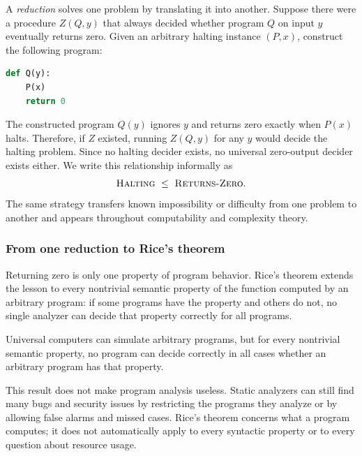\documentclass[11pt]{article}
\begin{document}
A \emph{reduction} solves one problem by translating it into another. Suppose
there were a procedure $Z(Q,y)$ that always decided whether program $Q$ on input
$y$ eventually returns zero. Given an arbitrary halting instance $(P,x)$,
construct the following program:

\begin{center}
\begin{minipage}{0.67\linewidth}
\begin{lstlisting}[language=Python]
def Q(y):
    P(x)
    return 0
\end{lstlisting}
\end{minipage}
\end{center}

The constructed program $Q(y)$ ignores $y$ and returns zero exactly when $P(x)$
halts. Therefore, if $Z$ existed, running $Z(Q,y)$ for any $y$ would decide the
halting problem. Since no halting decider exists, no universal zero-output
decider exists either. We write this relationship informally as
\[
  \textsc{Halting}\ \leq\ \textsc{Returns-Zero}.
\]
The same strategy transfers known impossibility or difficulty from one problem
to another and appears throughout computability and complexity theory.

\subsubsection*{From one reduction to Rice's theorem}

Returning zero is only one property of program behavior. Rice's theorem extends
the lesson to every nontrivial semantic property of the function computed by an
arbitrary program: if some programs have the property and others do not, no
single analyzer can decide that property correctly for all programs.

\begin{keyidea}
Universal computers can simulate arbitrary programs, but for every nontrivial
semantic property, no program can decide correctly in all cases whether an
arbitrary program has that property.
\end{keyidea}

This result does not make program analysis useless. Static analyzers can still
find many bugs and security issues by restricting the programs they analyze or
by allowing false alarms and missed cases. Rice's theorem concerns what a
program computes; it does not automatically apply to every syntactic property
or to every question about resource usage.
\end{document}
